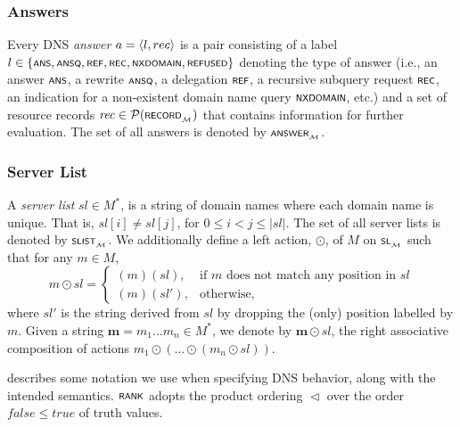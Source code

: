 \subsubsection{Answers}

\sloppy Every DNS \emph{answer} $a=\langle l,rec \rangle$ is a pair consisting of
a label $l\in\{\scrsf{ans},\scrsf{ansq},\scrsf{ref},\scrsf{rec},\scrsf{nxdomain},\scrsf{refused}\}$
denoting the type of answer (i.e., an answer $\scrsf{ans}$, a rewrite
$\scrsf{ansq}$, a delegation $\scrsf{ref}$, a recursive subquery
request $\scrsf{rec}$, an indication for a non-existent domain name query $\scrsf{nxdomain}$, etc.) and a set of resource records $\mathit{rec}\in\mathcal{P}(\scrsf{record}\subsub{\monoid})$
that contains information for further evaluation. The set of all answers is denoted by $\scrsf{answer}\subsub{\monoid}$.

\subsubsection{Server List}

A \emph{server list} $sl \in M^*$, is a string of domain names where each domain name is unique. That is, $sl[i] \neq sl[j]$, for $0\leq i < j \leq |sl|$. The set of all server lists is denoted by $\scrsf{slist}\subsub{\monoid}$. We additionally define a left action, $\odot$, of $M$ on $\scrsf{sl}\subsub{\monoid}$ such that for any $m\in M$, 
\[m \odot sl = \begin{cases}
	(m)(sl), & \text{if } m \text{ does not match any position in } sl\\
	(m)(sl'), & \text{otherwise,}
\end{cases}\]
where $sl'$ is the string derived from $sl$ by dropping the (only) position labelled by $m$. Given a string $\mathbf{m} = m_1\ldots m_n \in M^*$, we denote by $\mathbf{m}\odot sl$, the right associative composition of actions $m_1\odot (\ldots \odot(m_n \odot sl))$.

 describes some notation we use
when specifying DNS behavior, along with the intended semantics. $\scrsf{rank}$ adopts the product ordering $\vartriangleleft$
over the order $\mathit{false}\leq \mathit{true}$ of truth values. 

